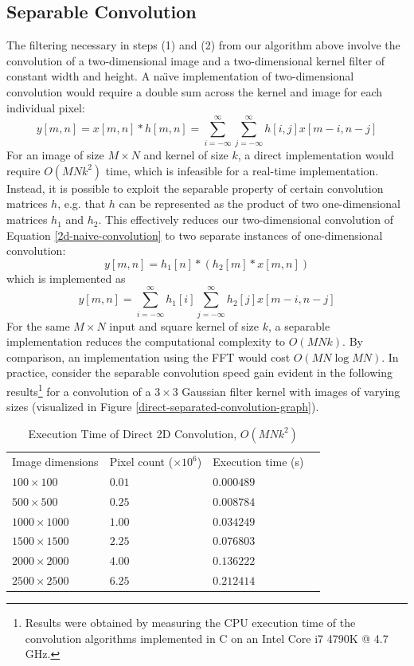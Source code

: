 \documentclass[journal]{IEEEtran}
\begin{document}
\subsection{Separable Convolution}
The filtering necessary in steps (1) and (2) from our algorithm above involve the convolution of a two-dimensional image and a two-dimensional kernel filter of constant width and height. A na\"{\i}ve implementation of two-dimensional convolution would require a double sum across the kernel and image for each individual pixel:
\begin{equation}
	\label{2d-naive-convolution}
	y[m, n] = x[m, n] * h[m, n] = \sum_{i = -\infty}^{\infty} \sum_{j = -\infty}^{\infty} h[i, j] x[m - i, n - j]
\end{equation}
For an image of size $M \times N$ and kernel of size $k$, a direct implementation would require $O(MNk^2)$ time, which is infeasible for a real-time implementation. Instead, it is possible to exploit the separable property of certain convolution matrices $h$, e.g. that $h$ can be represented as the product of two one-dimensional matrices $h_1$ and $h_2$. This effectively reduces our two-dimensional convolution of Equation \eqref{2d-naive-convolution} to two separate instances of one-dimensional convolution:
\begin{equation}
	\label{separable-convolution-definition}
	y[m, n] = h_1[n] * (h_2[m] * x[m, n])
\end{equation}
which is implemented as
\begin{equation}
	\label{separable-convolution-formula}
	y[m, n] = \sum_{i = -\infty}^{\infty}h_1[i] \sum_{j = -\infty}^{\infty}h_2[j] x[m - i, n - j]
\end{equation}
For the same $M \times N$ input and square kernel of size $k$, a separable implementation reduces the computational complexity to $O(MNk)$. By comparison, an implementation using the FFT would cost $O(MN\log{MN})$. In practice, consider the separable convolution speed gain evident in the following results\footnote{Results were obtained by measuring the CPU execution time of the convolution algorithms implemented in C on an Intel Core i7 4790K @ 4.7 GHz.} for a convolution of a $3 \times 3$ Gaussian filter kernel with images of varying sizes (visualized in Figure \ref{direct-separated-convolution-graph}).
\begin{table}[H]
	\small
	\centering
	\caption{Execution Time of Direct 2D Convolution, $O(MNk^2)$}
	\label{convolution-complexity-comparison}
	\begin{tabular}{llll}
	 Image dimensions & Pixel count ($\times10^6$) & Execution time (s) \\
	 $100 \times 100$ & $0.01$ & $0.000489$ \\
	 $500 \times 500$ & $0.25$ & $0.008784$ \\
	 $1000 \times 1000$ & $1.00$ & $0.034249$ \\
	 $1500 \times 1500$ & $2.25$ & $0.076803$ \\
	 $2000 \times 2000$ & $4.00$ & $0.136222$ \\
	 $2500 \times 2500$ & $6.25$ & $0.212414$ \\
	\end{tabular}
\end{table}
\end{document}
